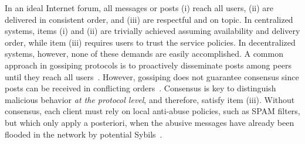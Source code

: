 \documentclass[12pt]{article}
\begin{document}
In an ideal Internet forum, all messages or posts
(i)   reach all users,
(ii)  are delivered in consistent order, and
(iii) are respectful and on topic.
In centralized systems, items (i) and (ii) are trivially achieved assuming
availability and delivery order, while item (iii) requires users to trust the
service policies.
In decentralized systems, however, none of these demands are easily
accomplished.
A common approach in gossiping protocols is to proactively disseminate posts
among peers until they reach all users~\cite{p2p.survey,p2p.byz}.
However, gossiping does not guarantee consensus since posts can be received in
conflicting orders~\cite{p2p.intention}.
%
Consensus is key to distinguish malicious behavior \emph{at the protocol
level}, and therefore, satisfy item (iii).
Without consensus, each client must rely on local anti-abuse policies, such as
SPAM filters, but which only apply a posteriori, when the abusive messages have
already been flooded in the network by potential Sybils~\cite{p2p.sybil}.
%

\end{document}
